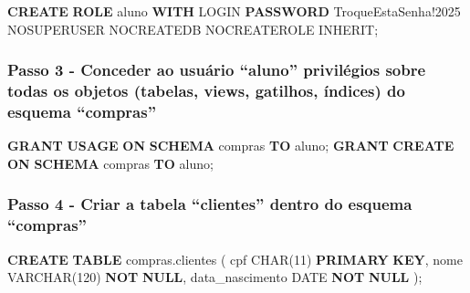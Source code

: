 \documentclass[
]{book}
\newenvironment{Shaded}{\begin{snugshade}}{\end{snugshade}}
\newcommand{\DataTypeTok}[1]{\textcolor[rgb]{0.13,0.29,0.53}{#1}}
\newcommand{\DecValTok}[1]{\textcolor[rgb]{0.00,0.00,0.81}{#1}}
\newcommand{\KeywordTok}[1]{\textcolor[rgb]{0.13,0.29,0.53}{\textbf{#1}}}
\newcommand{\NormalTok}[1]{#1}
\newcommand{\StringTok}[1]{\textcolor[rgb]{0.31,0.60,0.02}{#1}}
\begin{document}
\begin{Shaded}
\begin{Highlighting}[]
\KeywordTok{CREATE} \KeywordTok{ROLE}\NormalTok{ aluno }\KeywordTok{WITH}
\NormalTok{    LOGIN}
    \KeywordTok{PASSWORD} \StringTok{\textquotesingle{}TroqueEstaSenha!2025\textquotesingle{}}
\NormalTok{    NOSUPERUSER}
\NormalTok{    NOCREATEDB}
\NormalTok{    NOCREATEROLE}
\NormalTok{    INHERIT;}
\end{Highlighting}
\end{Shaded}

\subsubsection{Passo 3 - Conceder ao usuário ``aluno'' privilégios sobre todas os objetos (tabelas, views, gatilhos, índices) do esquema ``compras''}\label{passo-3---conceder-ao-usuuxe1rio-aluno-priviluxe9gios-sobre-todas-os-objetos-tabelas-views-gatilhos-uxedndices-do-esquema-compras}

\begin{Shaded}
\begin{Highlighting}[]
\KeywordTok{GRANT} \KeywordTok{USAGE} \KeywordTok{ON} \KeywordTok{SCHEMA}\NormalTok{ compras }\KeywordTok{TO}\NormalTok{ aluno;}
\KeywordTok{GRANT} \KeywordTok{CREATE} \KeywordTok{ON} \KeywordTok{SCHEMA}\NormalTok{ compras }\KeywordTok{TO}\NormalTok{ aluno;}
\end{Highlighting}
\end{Shaded}

\subsubsection{Passo 4 - Criar a tabela ``clientes'' dentro do esquema ``compras''}\label{passo-4---criar-a-tabela-clientes-dentro-do-esquema-compras}

\begin{Shaded}
\begin{Highlighting}[]
\KeywordTok{CREATE} \KeywordTok{TABLE}\NormalTok{ compras.clientes (}
\NormalTok{    cpf            }\DataTypeTok{CHAR}\NormalTok{(}\DecValTok{11}\NormalTok{)     }\KeywordTok{PRIMARY} \KeywordTok{KEY}\NormalTok{,}
\NormalTok{    nome           }\DataTypeTok{VARCHAR}\NormalTok{(}\DecValTok{120}\NormalTok{) }\KeywordTok{NOT} \KeywordTok{NULL}\NormalTok{,}
\NormalTok{    data\_nascimento }\DataTypeTok{DATE}        \KeywordTok{NOT} \KeywordTok{NULL}
\NormalTok{);}
\end{Highlighting}
\end{Shaded}
\end{document}
